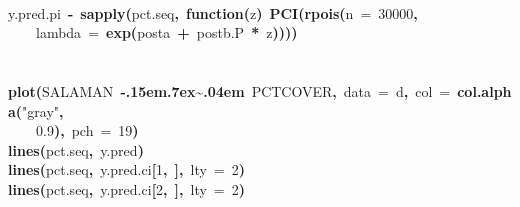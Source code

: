 \documentclass{article}
\makeatletter
\newcommand{\hlnumber}[1]{\textcolor[rgb]{0,0,0}{#1}}%
\newcommand{\hlfunctioncall}[1]{\textcolor[rgb]{.5,0,.33}{\textbf{#1}}}%
\newcommand{\hlstring}[1]{\textcolor[rgb]{.6,.6,1}{#1}}%
\newcommand{\hlkeyword}[1]{\textbf{#1}}%
\newcommand{\hlargument}[1]{\textcolor[rgb]{.69,.25,.02}{#1}}%
\newcommand{\hlformalargs}[1]{\hlargument{#1}}%
\newcommand{\hlassignement}[1]{\textbf{#1}}%
\newcommand{\hlsymbol}[1]{#1}%
\def\urltilda{\kern -.15em\lower .7ex\hbox{\~{}}\kern .04em}%
\newcommand{\hlstd}[1]{\textcolor[rgb]{0,0,0}{#1}}%
\newenvironment{kframe}{%
 \def\FrameCommand##1{\hskip\@totalleftmargin \hskip-\fboxsep
 \colorbox{shadecolor}{##1}\hskip-\fboxsep
     \hskip-\linewidth \hskip-\@totalleftmargin \hskip\columnwidth}%
 \MakeFramed {\advance\hsize-\width
   \@totalleftmargin\z@ \linewidth\hsize
   \@setminipage}}%
 {\par\unskip\endMakeFramed}
\newenvironment{knitrout}{}{} %
\makeatother
\begin{document}
\begin{knitrout}
{\begin{kframe}
\begin{flushleft}
\hlstd{}\hspace*{\fill}\\
\hlstd{}\hlsymbol{y.pred.pi}{\ }\hlassignement{\usebox{\hlnormalsizeboxlessthan}-}{\ }\hlfunctioncall{sapply}\hlkeyword{(}\hlsymbol{pct.seq}\hlkeyword{,}{\ }\hlkeyword{function}\hlkeyword{(}\hlformalargs{z}\hlkeyword{)}{\ }\hlfunctioncall{PCI}\hlkeyword{(}\hlfunctioncall{rpois}\hlkeyword{(}\hlargument{n}{\ }\hlargument{=}{\ }\hlnumber{30000}\hlkeyword{,}\hspace*{\fill}\\
\hlstd{}{\ }{\ }{\ }{\ }\hlargument{lambda}{\ }\hlargument{=}{\ }\hlfunctioncall{exp}\hlkeyword{(}\hlsymbol{post}\hlkeyword{\usebox{\hlnormalsizeboxdollar}}\hlsymbol{a}{\ }\hlkeyword{+}{\ }\hlsymbol{post}\hlkeyword{\usebox{\hlnormalsizeboxdollar}}\hlsymbol{b.P}{\ }\hlkeyword{*}{\ }\hlsymbol{z}\hlkeyword{)}\hlkeyword{)}\hlkeyword{)}\hlkeyword{)}\hspace*{\fill}\\
\hlstd{}\hspace*{\fill}\\
\hlstd{}\hspace*{\fill}\\
\hlstd{}\hlfunctioncall{plot}\hlkeyword{(}\hlsymbol{SALAMAN}{\ }\hlkeyword{\urltilda{}}{\ }\hlsymbol{PCTCOVER}\hlkeyword{,}{\ }\hlargument{data}{\ }\hlargument{=}{\ }\hlsymbol{d}\hlkeyword{,}{\ }\hlargument{col}{\ }\hlargument{=}{\ }\hlfunctioncall{col.alpha}\hlkeyword{(}\hlstring{"{}gray"{}}\hlkeyword{,}\hspace*{\fill}\\
\hlstd{}{\ }{\ }{\ }{\ }\hlnumber{0.9}\hlkeyword{)}\hlkeyword{,}{\ }\hlargument{pch}{\ }\hlargument{=}{\ }\hlnumber{19}\hlkeyword{)}\hspace*{\fill}\\
\hlstd{}\hlfunctioncall{lines}\hlkeyword{(}\hlsymbol{pct.seq}\hlkeyword{,}{\ }\hlsymbol{y.pred}\hlkeyword{)}\hspace*{\fill}\\
\hlstd{}\hlfunctioncall{lines}\hlkeyword{(}\hlsymbol{pct.seq}\hlkeyword{,}{\ }\hlsymbol{y.pred.ci}\hlkeyword{[}\hlnumber{1}\hlkeyword{,}{\ }\hlkeyword{]}\hlkeyword{,}{\ }\hlargument{lty}{\ }\hlargument{=}{\ }\hlnumber{2}\hlkeyword{)}\hspace*{\fill}\\
\hlstd{}\hlfunctioncall{lines}\hlkeyword{(}\hlsymbol{pct.seq}\hlkeyword{,}{\ }\hlsymbol{y.pred.ci}\hlkeyword{[}\hlnumber{2}\hlkeyword{,}{\ }\hlkeyword{]}\hlkeyword{,}{\ }\hlargument{lty}{\ }\hlargument{=}{\ }\hlnumber{2}\hlkeyword{)}\hspace*{\fill}\\

\end{flushleft}
\end{kframe}}
\end{knitrout}
\end{document}
